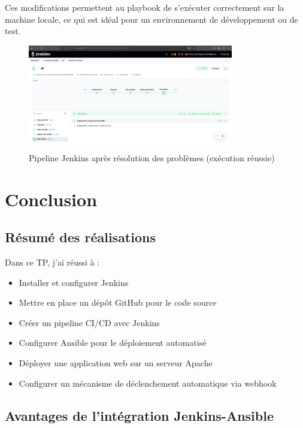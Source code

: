 \documentclass{article}
\begin{document}
Ces modifications permettent au playbook de s'exécuter correctement sur la machine locale, ce qui est idéal pour un environnement de développement ou de test.

\begin{figure}[h]
    \centering
    \includegraphics[width=0.8\textwidth]{images/jenkins_pipeline_success.png}
    \caption{Pipeline Jenkins après résolution des problèmes (exécution réussie)}
    \label{fig:jenkins_pipeline_success}
\end{figure}

\section{Conclusion}
\subsection{Résumé des réalisations}

Dans ce TP, j'ai réussi à :
\begin{itemize}
    \item Installer et configurer Jenkins
    \item Mettre en place un dépôt GitHub pour le code source
    \item Créer un pipeline CI/CD avec Jenkins
    \item Configurer Ansible pour le déploiement automatisé
    \item Déployer une application web sur un serveur Apache
    \item Configurer un mécanisme de déclenchement automatique via webhook
\end{itemize}

\subsection{Avantages de l'intégration Jenkins-Ansible}
\end{document}
